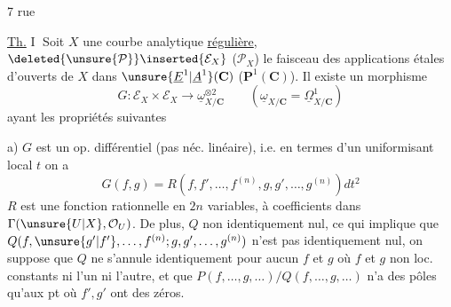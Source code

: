 

7 rue 



\uline{Th.} \textcircled{I} Soit $X$ une courbe analytique \uline{régulière},
$\deleted{\unsure{\mathcal{P}}}\inserted{\mathcal{E}_X}$ ($\mathcal{P}_X$) le
faisceau des applications étales d'ouverts de $X$ dans
$\unsure{\underline{E}^{1}|\underline{A}^{1}}(\mathbf{C})$
($\mathbf{P}^{1}(\mathbf{C})$). Il existe un morphisme
\[
G:\mathcal{E}_X\times\mathcal{E}_X\longrightarrow
\underline{\omega}_{X/\mathbf{C}}^{\otimes2}
\qquad
(\underline{\omega}_{X/\mathbf{C}}=\underline{\Omega}^{1}_{X/\mathbf{C}})
\]
ayant les propriétés suivantes

a) $G$ est un op. différentiel (pas néc. linéaire), i.e. en
termes d'un uniformisant local $t$  on a
\[
G(f,g)=R(f,f',\ldots,f^{(n)},g,g',\ldots,g^{(n)})dt^2
\]
$R$ est une fonction rationnelle en $2n$ variables, à
coefficients dans $\Gamma(\unsure{U|X},\mathcal{O}_U)$.
De plus, 
$Q$ non identiquement nul,  ce qui implique
que $Q(f,\unsure{g'|f'},\ldots,f^{(n)};g,g',\ldots,g^{(n)})$ n'est pas identiquement
nul, on suppose que $Q$ ne s'annule identiquement pour
aucun $f$ et $g$ où $f$ et $g$ non loc. constants ni l'un
ni l'autre, et que $P(f,\ldots,g,\ldots)/Q(f,\ldots,g,\ldots)$ n'a
 des pôles qu'aux pt où $f',g'$ ont des zéros.

